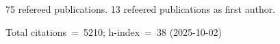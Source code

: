 75 refereed publications. 13 refeered publications as first author.

Total citations~=~5210; h-index~=~38 (2025-10-02)